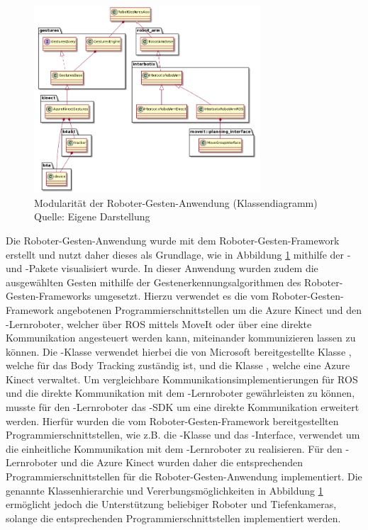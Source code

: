 \begin{figure}[htb]
	\centering
	\includegraphics[width=0.75\textwidth]{images/loesungsweg/gesture_robot_system_uml}
	\caption[Modularität der Roboter-Gesten-Anwendung (Klassendiagramm)]{Modularität der Roboter-Gesten-Anwendung (Klassendiagramm)\\Quelle: Eigene Darstellung}
	\label{fig:gesture_robot_system_uml}
\end{figure}
\FloatBarrier

Die Roboter-Gesten-Anwendung wurde mit dem Roboter-Gesten-Framework erstellt und nutzt daher dieses als Grundlage, wie in Abbildung \ref{fig:gesture_robot_system_uml} mithilfe der - und -Pakete visualisiert wurde. In dieser Anwendung wurden zudem die ausgewählten Gesten mithilfe der Gestenerkennungsalgorithmen des Roboter-Gesten-Frameworks umgesetzt. Hierzu verwendet es die vom Roboter-Gesten-Framework angebotenen Programmierschnittstellen um die Azure Kinect und den -Lernroboter, welcher über ROS mittels MoveIt oder über eine direkte Kommunikation angesteuert werden kann, miteinander kommunizieren lassen zu können. Die -Klasse verwendet hierbei die von Microsoft bereitgestellte Klasse , welche für das Body Tracking zuständig ist, und die Klasse , welche eine Azure Kinect verwaltet. Um vergleichbare Kommunikationsimplementierungen für ROS und die direkte Kommunikation mit dem -Lernroboter gewährleisten zu können, musste für den -Lernroboter das -SDK um eine direkte Kommunikation erweitert werden. Hierfür wurden die vom Roboter-Gesten-Framework bereitgestellten Programmierschnittstellen, wie z.B. die -Klasse und das -Interface, verwendet um die einheitliche Kommunikation mit dem -Lernroboter zu realisieren. Für den -Lernroboter und die Azure Kinect wurden daher die entsprechenden Programmierschnittstellen für die Roboter-Gesten-Anwendung implementiert. Die genannte Klassenhierarchie und Vererbungsmöglichkeiten in Abbildung \ref{fig:gesture_robot_system_uml} ermöglicht jedoch die Unterstützung beliebiger Roboter und Tiefenkameras, solange die entsprechenden Programmierschnittstellen implementiert werden.\\


